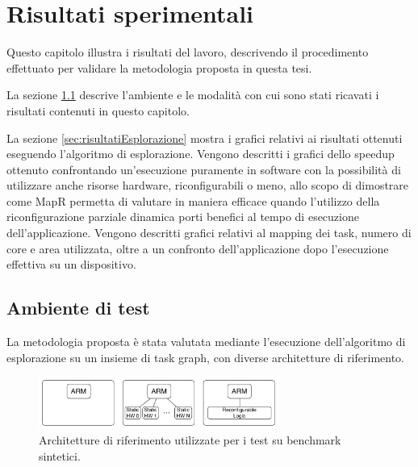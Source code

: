 \chapter{Risultati sperimentali}
\label{chap:risultati}
\vspace{1cm}
Questo capitolo illustra i risultati del lavoro, descrivendo
il procedimento effettuato per validare la metodologia proposta
in questa tesi.

La sezione \ref{sec:ambienteTest} descrive l'ambiente e le
modalit\`a con cui sono stati ricavati i risultati contenuti
in questo capitolo.

La sezione \ref{sec:risultatiEsplorazione} mostra i grafici relativi
ai risultati ottenuti eseguendo l'algoritmo di esplorazione.
Vengono descritti i grafici dello speedup ottenuto
confrontando un'esecuzione puramente in software con la possibilit\`a
di utilizzare anche risorse hardware, riconfigurabili o meno, allo
scopo di dimostrare come MapR permetta di valutare in maniera efficace
quando l'utilizzo della riconfigurazione parziale dinamica porti benefici al
tempo di esecuzione dell'applicazione. Vengono descritti grafici relativi
al mapping dei task, numero di core e area utilizzata, oltre a un confronto
dell'applicazione dopo l'esecuzione effettiva su un dispositivo.

\newpage

\section{Ambiente di test}
\label{sec:ambienteTest}

La metodologia proposta \`e stata valutata mediante l'esecuzione
dell'algoritmo di esplorazione su un insieme di task graph,
con diverse architetture di riferimento.


\begin{figure}[t]
  \begin{center}
    \includegraphics[width=0.7\textwidth]{./capitoli/figure/cap6/templates.pdf}
    \caption{Architetture di riferimento utilizzate per i test su benchmark sintetici.}
    \label{fig:architettureTestSintetici}
  \end{center}
\end{figure}

